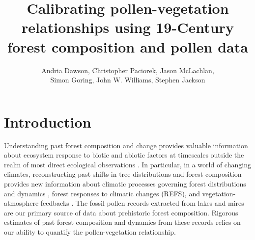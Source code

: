 \documentclass[12pt]{article}
\begin{document}
\nocite{*}

\title{Calibrating pollen-vegetation relationships using 19-Century forest composition and pollen data}

\author{Andria Dawson, Christopher Paciorek, Jason McLachlan,\\ Simon Goring, John W. Williams, Stephen Jackson}

\maketitle

\section{Introduction}
Understanding past forest composition and change provides valuable
information about ecosystem response to biotic and abiotic factors at
timescales outside the realm of most direct ecological observations
\citep{jackson2007looking}. In particular, in a world of changing
climates, reconstructing past shifts in tree distributions and forest
composition provides new information about climatic processes
governing forest distributions and dynamics \citep{goring2015a},
forest responses to climatic changes (REFS), and vegetation-atmosphere
feedbacks \citep{matthes2015}. The fossil pollen records extracted
from lakes and mires are our primary source of data about prehistoric
forest composition. Rigorous estimates of past forest composition and
dynamics from these records relies on our ability to quantify the
pollen-vegetation relationship.
\end{document}
